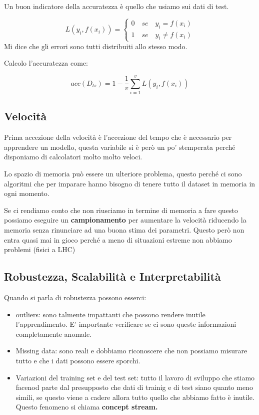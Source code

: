 \documentclass[12pt, a4paper,titlepage,openany]{article}
\begin{document}
Un buon indicatore della accuratezza è quello che usiamo sui dati di test.


\[L(y_{i}, f(x_{i})) =
\begin{cases}
	0 \quad se \quad  y_{i} = f(x_{i})
	\\ 1 \quad se \quad  y_{i} \neq f(x_{i})
\end{cases}
\]
Mi dice che gli errori sono tutti distribuiti allo stesso modo.

Calcolo l'accuratezza come:

\[ acc(D_{ts}) = 1 - \frac{1}{v} \sum_{i=1}^{v} L(y_{i}, f(x_{i})) \]

\subsection{Velocità}

Prima accezione della velocità è l'accezione del tempo che è necessario per apprendere un modello, questa variabile si è però un po' stemperata perché disponiamo di calcolatori molto molto veloci.

Lo spazio di memoria può essere un ulteriore problema, questo perché ci sono algoritmi che per imparare hanno bisogno di tenere tutto il dataset in memoria in ogni momento.

Se ci rendiamo conto che non riusciamo in termine di memoria a fare questo possiamo eseguire un \textbf{campionamento} per aumentare la velocità riducendo la memoria senza rinunciare ad una buona stima dei parametri. Questo però non entra quasi mai in gioco perché a meno di situazioni estreme non abbiamo problemi (fisici a LHC)

\subsection{Robustezza, Scalabilità e Interpretabilità}

Quando si parla di robustezza possono esserci:

\begin{itemize}
	\item outliers: sono talmente impattanti che possono rendere inutile l'apprendimento. E' importante verificare se ci sono queste informazioni completamente anomale.
	\item Missing data: sono reali e dobbiamo riconoscere che non possiamo misurare tutto e che i dati possono essere sporchi.
	\item Variazioni del training set e del test set: tutto il lavoro di sviluppo che stiamo facenod parte dal presupposto che dati di trainig e di test siano quanto meno simili, se questo viene a cadere allora tutto quello che abbiamo fatto è inutile. Questo fenomeno si chiama \textbf{concept stream.}
\end{itemize}
\end{document}
